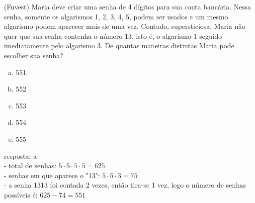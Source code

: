\begin{ex}
 (Fuvest) Maria deve criar uma senha de 4 dígitos para sua conta bancária. Nessa senha, somente os algarismos 1, 2, 3, 4, 5, podem ser usados e um mesmo algarismo podem aparecer mais de uma vez. Contudo, supersticiosa, Maria não quer que sua senha contenha o número 13, isto é, o algarismo 1 seguido imediatamente pelo algarismo 3. De quantas maneiras distintas Maria pode escolher sua senha? 
    \begin{enumerate} [(a)]
        \item 551
        \item 552
        \item 553
        \item 554
        \item 555
    \end{enumerate}
     \begin{sol}
      resposta: a \\
      - total de senhas: $5\cdot5\cdot5\cdot5=625$ \\
      - senhas em que aparece o "13":\hspace{0,4cm} $5\cdot5\cdot3=75$\\
      - a senha 1313 foi contada 2 vezes, então tira-se 1 vez, logo o número de senhas possíveis é:\hspace{0,3cm}
      $625 - 74 =551$
     \end{sol}
 \end{ex}